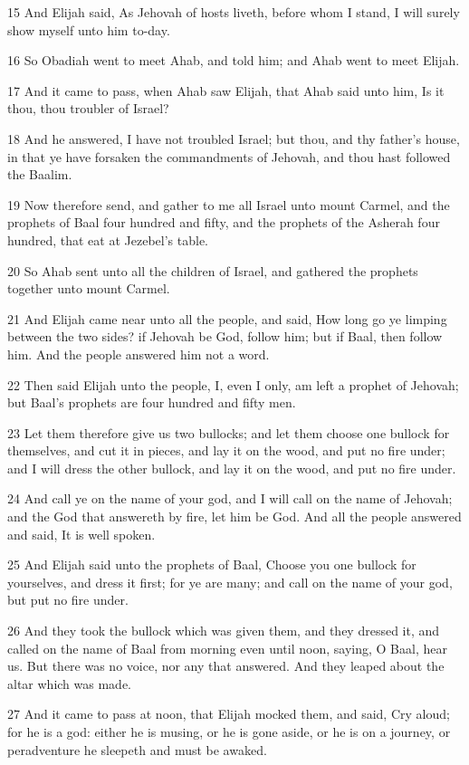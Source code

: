 \par 15 And Elijah said, As Jehovah of hosts liveth, before whom I stand, I will surely show myself unto him to-day.
\par 16 So Obadiah went to meet Ahab, and told him; and Ahab went to meet Elijah.
\par 17 And it came to pass, when Ahab saw Elijah, that Ahab said unto him, Is it thou, thou troubler of Israel?
\par 18 And he answered, I have not troubled Israel; but thou, and thy father's house, in that ye have forsaken the commandments of Jehovah, and thou hast followed the Baalim.
\par 19 Now therefore send, and gather to me all Israel unto mount Carmel, and the prophets of Baal four hundred and fifty, and the prophets of the Asherah four hundred, that eat at Jezebel's table.
\par 20 So Ahab sent unto all the children of Israel, and gathered the prophets together unto mount Carmel.
\par 21 And Elijah came near unto all the people, and said, How long go ye limping between the two sides? if Jehovah be God, follow him; but if Baal, then follow him. And the people answered him not a word.
\par 22 Then said Elijah unto the people, I, even I only, am left a prophet of Jehovah; but Baal's prophets are four hundred and fifty men.
\par 23 Let them therefore give us two bullocks; and let them choose one bullock for themselves, and cut it in pieces, and lay it on the wood, and put no fire under; and I will dress the other bullock, and lay it on the wood, and put no fire under.
\par 24 And call ye on the name of your god, and I will call on the name of Jehovah; and the God that answereth by fire, let him be God. And all the people answered and said, It is well spoken.
\par 25 And Elijah said unto the prophets of Baal, Choose you one bullock for yourselves, and dress it first; for ye are many; and call on the name of your god, but put no fire under.
\par 26 And they took the bullock which was given them, and they dressed it, and called on the name of Baal from morning even until noon, saying, O Baal, hear us. But there was no voice, nor any that answered. And they leaped about the altar which was made.
\par 27 And it came to pass at noon, that Elijah mocked them, and said, Cry aloud; for he is a god: either he is musing, or he is gone aside, or he is on a journey, or peradventure he sleepeth and must be awaked.
